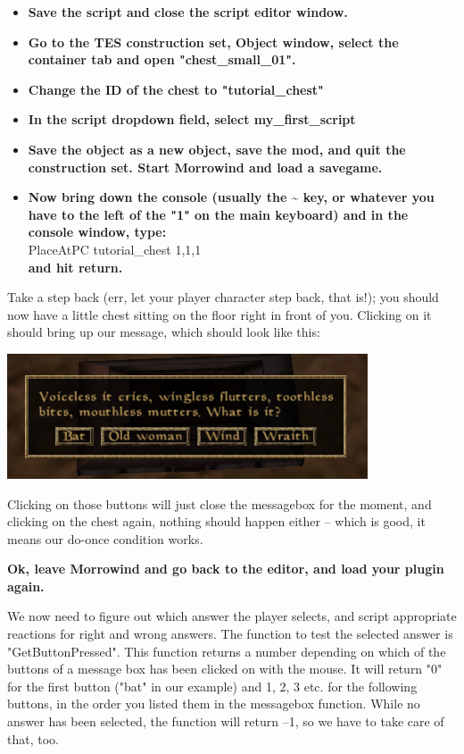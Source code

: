 \documentclass[
]{article}
\begin{document}
\begin{itemize}
\item
  \textbf{Save the script and close the script editor window.}
\item
  \textbf{Go to the TES construction set, Object window, select the
  container tab and open "chest\_small\_01".}
\item
  \textbf{Change the ID of the chest to "tutorial\_chest"}
\item
  \textbf{In the script dropdown field, select my\_first\_script}
\item
  \textbf{Save the object as a new object, save the mod, and quit the
  construction set. Start Morrowind and load a savegame.}
\item
  \textbf{Now bring down the console (usually the \textasciitilde{} key,
  or whatever you have to the left of the "1" on the main keyboard) and
  in the console window, type:}\\
  PlaceAtPC tutorial\_chest 1,1,1\\
  \textbf{and hit return.}
\end{itemize}

Take a step back (err, let your player character step back, that is!);
you should now have a little chest sitting on the floor right in front
of you. Clicking on it should bring up our message, which should look
like this:

\includegraphics{media/image3.png}

Clicking on those buttons will just close the messagebox for the moment,
and clicking on the chest again, nothing should happen either -- which
is good, it means our do-once condition works.

\textbf{Ok, leave Morrowind and go back to the editor, and load your
plugin again.}

We now need to figure out which answer the player selects, and script
appropriate reactions for right and wrong answers. The function to test
the selected answer is "GetButtonPressed". This function returns a
number depending on which of the buttons of a message box has been
clicked on with the mouse. It will return "0" for the first button
("bat" in our example) and 1, 2, 3 etc. for the following buttons, in
the order you listed them in the messagebox function. While no answer
has been selected, the function will return --1, so we have to take care
of that, too.
\end{document}
